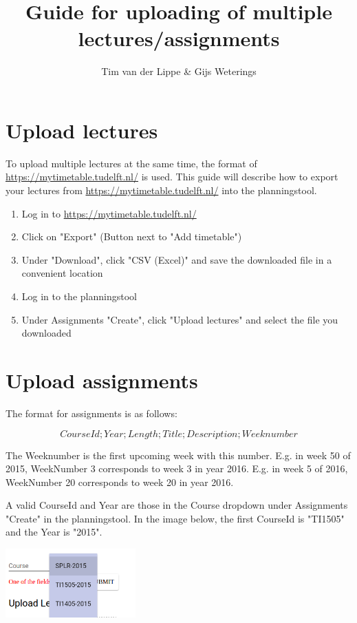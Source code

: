 \documentclass[a4paper,12pt]{article}
\begin{document}
\title{Guide for uploading of multiple lectures/assignments}
\author{Tim van der Lippe \& Gijs Weterings}
\maketitle

\newpage

\section{Upload lectures}

To upload multiple lectures at the same time, the format of \url{https://mytimetable.tudelft.nl/} is used.
This guide will describe how to export your lectures from \url{https://mytimetable.tudelft.nl/} into the planningstool.

\begin{enumerate}
  \item Log in to \url{https://mytimetable.tudelft.nl/}

  \item Click on "Export" (Button next to "Add timetable")

  \item Under "Download", click "CSV (Excel)" and save the downloaded file in a convenient location

  \item Log in to the planningstool

  \item Under Assignments "Create", click "Upload lectures" and select the file you downloaded

\end{enumerate}

\section{Upload assignments}

The format for assignments is as follows:

\[CourseId;Year;Length;Title;Description;Weeknumber\]

The Weeknumber is the first upcoming week with this number.
E.g. in week 50 of 2015, WeekNumber 3 corresponds to week 3 in year 2016.
E.g. in week 5 of 2016, WeekNumber 20 corresponds to week 20 in year 2016.

A valid CourseId and Year are those in the Course dropdown under Assignments "Create" in the planningstool.
In the image below, the first CourseId is "TI1505" and the Year is "2015".

\includegraphics[width=5cm]{courses.png}
\end{document}

